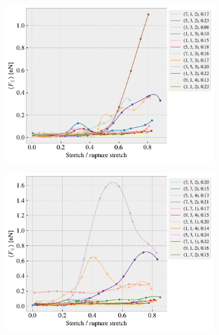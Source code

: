 \begin{figure}[H]
    \centering
    \begin{subfigure}[b]{0.49\textwidth}
        \centering
        \includegraphics[width=\textwidth]{figures/stretch_profiles/popup/SP_0_popup.pdf}
        \caption{}
        \label{fig:}
    \end{subfigure}
    \hfill
    \begin{subfigure}[b]{0.49\textwidth}
        \centering
        \includegraphics[width=\textwidth]{figures/stretch_profiles/popup/SP_1_popup.pdf}
        \caption{}
        \label{fig:}
    \end{subfigure}
    \hfill
    \begin{subfigure}[b]{0.49\textwidth}

\end{subfigure}
\end{figure}
